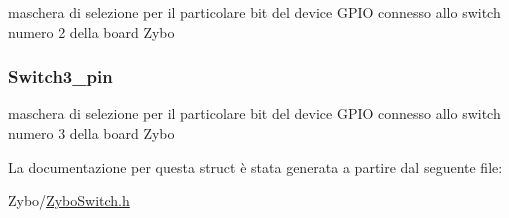 maschera di selezione per il particolare bit del device G\+P\+I\+O connesso allo switch numero 2 della board Zybo \hypertarget{struct_zybo_switch__t_ab2ea73dda75022931396b29e1c377cfb}{
\subsubsection[{Switch3\+\_\+pin}]{ Switch3\+\_\+pin}}\label{struct_zybo_switch__t_ab2ea73dda75022931396b29e1c377cfb}
maschera di selezione per il particolare bit del device G\+P\+I\+O connesso allo switch numero 3 della board Zybo 

La documentazione per questa struct è stata generata a partire dal seguente file\+:\begin{DoxyCompactItemize}
\item 
Zybo/\hyperlink{_zybo_switch_8h}{Zybo\+Switch.\+h}\end{DoxyCompactItemize}

